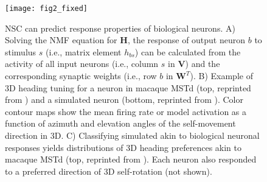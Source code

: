 \begin{figure}[h]
	\centering
	\texttt{[image: fig2\_fixed]}
    \caption{\ac{NSC} can predict response properties of biological neurons.
    A) Solving the \ac{NMF} equation for \textbf{H}, the response
       of output neuron $b$ to stimulus $s$ (i.e., matrix element
       $h_{bs}$) can be calculated from the activity of all
       input neurons (i.e., column $s$ in \textbf{V}) and the
       corresponding synaptic weights (i.e., row $b$ in
       $\mathbf{W}^T$).
    B) Example of 3D heading tuning for a neuron in macaque
       \ac{MSTd} (top, reprinted from \cite{Takahashi2007}) and a
       simulated neuron (bottom, reprinted from \cite{Beyeler2016}).
       Color contour maps show the mean firing rate or model
       activation as a function of azimuth and elevation angles
       of the self-movement direction in 3D.
    C) Classifying simulated akin to biological neuronal responses
       yields distributions of 3D heading preferences akin to 
       macaque \ac{MSTd} (top, reprinted from \cite{Beyeler2016}).
       Each neuron also responded to a preferred direction of 3D
       self-rotation (not shown).}
	\label{fig:NMF|neuronalresponse}
\end{figure}




